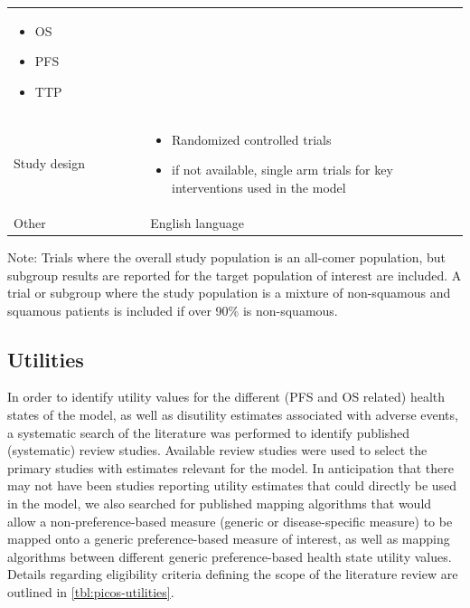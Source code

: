 \documentclass[11pt,final,fleqn]{article}\usepackage[]{graphicx}\usepackage[]{color}
\theoremstyle{plain}
\begin{document}
\begin{appendices}
\begin{table}[!ht]
\begin{center}
\begin{threeparttable}
\begin{tabular}{p{0.3\linewidth}p{0.7\linewidth}}
\begin{itemize}
\item OS
\item PFS
\item TTP
\end{itemize} \\
Study design &
\begin{itemize}
\item Randomized controlled trials
\item if not available, single arm trials for key interventions used in the model
\end{itemize} \\
Other & English language\\
\hline
\end{tabular}
\scriptsize Note: Trials where the overall study population is an all-comer population, but subgroup results are reported for the target population of interest are included. A trial or subgroup where the study population is a mixture of non-squamous and squamous patients is included if over 90\% is non-squamous.  
\end{threeparttable}
\end{center}
\end{table}






\subsection{Utilities}
In order to identify utility values for the different (PFS and OS related) health states of the model, as well as disutility estimates associated with adverse events, a systematic search of the literature was performed to identify published (systematic) review studies. Available review studies were used to select the primary studies with estimates relevant for the model. In anticipation that there may not have been studies reporting utility estimates that could directly be used in the model, we also searched for published mapping algorithms that would allow a non-preference-based measure (generic or disease-specific measure) to be mapped onto a generic preference-based measure of interest, as well as mapping algorithms between different generic preference-based health state utility values. Details regarding eligibility criteria defining the scope of the literature review are outlined in \autoref{tbl:picos-utilities}. 



\end{appendices}
\end{document}
